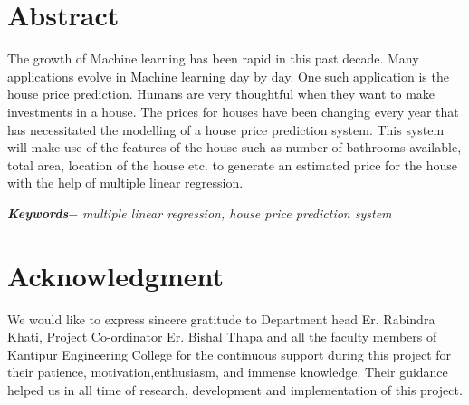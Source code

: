 


\KECcoverpage  %




\chapter*{Abstract} %
The growth of Machine learning has been rapid in this past decade. Many applications evolve in Machine learning day by day. One such application is the house price prediction. Humans are very thoughtful when they want to make investments in a house. The prices for houses have been changing every year that has necessitated the modelling of a house price prediction system. This system will make use of the features of the house such as number of bathrooms available, total area, location of the house etc. to generate an estimated price for the house with the help of multiple linear regression.
\par
\textbf{\textit{Keywords$-$}} \emph{multiple linear regression, house price prediction system}

\chapter*{Acknowledgment}
We would like to express sincere gratitude to Department head Er. Rabindra Khati, Project Co-ordinator Er. Bishal Thapa and all the faculty members of Kantipur Engineering College for the continuous support during this project for their patience, motivation,enthusiasm, and immense knowledge. Their guidance helped us in all time of research, development and implementation of this project.   \par
\begin{flushright}
\vskip -20pt
\submittedBy

\end{flushright}

